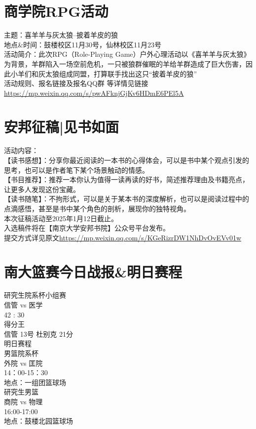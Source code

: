 \documentclass[letterpaper, 12pt]{article}
\begin{document}
\begin{multicols}{2}
\section{商学院RPG活动}
主题：喜羊羊与灰太狼--披着羊皮的狼
\\地点\&时间：鼓楼校区11月30号，仙林校区11月23号
\\活动简介：此次RPG（Role-Playing Game）户外心理活动以《喜羊羊与灰太狼》为背景，羊群陷入一场空前危机，一只被狼群催眠的羊给羊群造成了巨大伤害，因此小羊们和灰太狼组成同盟，打算联手找出这只“披着羊皮的狼”
\\活动规则、报名链接及报名QQ群 等详情见链接\url{https://mp.weixin.qq.com/s/pwAFknjGjKv6HDmE6PEl5A}

\section{安邦征稿|见书如面}
活动内容：\\
【读书感想】：分享你最近阅读的一本书的心得体会，可以是书中某个观点引发的思考，也可以是作者笔下某个场景触动的情感。\\
【书目推荐】：推荐一本你认为值得一读再读的好书，简述推荐理由及书籍亮点，让更多人发现这份宝藏。\\
【读书随笔】：不拘形式，可以是关于某本书的深度解析，也可以是阅读过程中的点滴感悟，甚至是书中某个角色的剖析，展现你的独特视角。\\
本次征稿活动至2025年1月12日截止。\\
入选稿件将在【南京大学安邦书院】公众号平台发布。\\
提交方式详见原文\url{https://mp.weixin.qq.com/s/KGeRizrDW1NhDvOvEVv01w}

\section{南大篮赛今日战报\&明日赛程}
研究生院系杯小组赛\\
信管 vs 医学\\
42 : 30\\
得分王\\
信管 13号 杜别克 21分\\
明日赛程\\
男篮院系杯\\
外院 vs 匡院\\
14：00-15：30\\
地点：一组团篮球场\\
研究生男篮\\
商院 vs 物理\\ 
16:00-17:00\\
地点：鼓楼北园篮球场\\


\end{multicols} 
\end{document}
